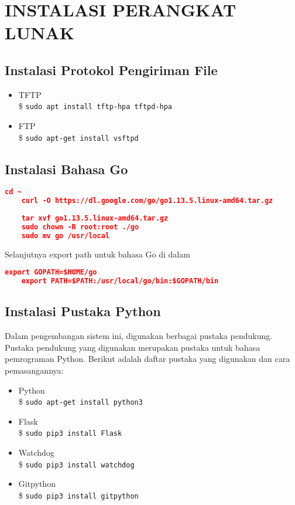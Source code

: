 \chapter{INSTALASI PERANGKAT LUNAK}

\section*{Instalasi Protokol Pengiriman File}
	
	\begin{itemize}
	\item TFTP \\
		\$ \texttt{sudo apt install tftp-hpa tftpd-hpa}
	\item FTP \\
		\$ \texttt{sudo apt-get install vsftpd}
	\end{itemize} 

\section*{Instalasi Bahasa Go}
	\begin{lstlisting}[frame=single,tabsize=2,breaklines,caption={Instalasi Bahasa Go},label=InstalasiGo, captionpos=b, language=json,numbers=none]
	cd ~
	curl -O https://dl.google.com/go/go1.13.5.linux-amd64.tar.gz
	
	tar xvf go1.13.5.linux-amd64.tar.gz
	sudo chown -R root:root ./go
	sudo mv go /usr/local
	\end{lstlisting}
	Selanjutnya export path untuk bahasa Go di dalam 
	\begin{lstlisting}[frame=single,tabsize=2,breaklines,caption={Pengaturan Path},label=nonrootuser, captionpos=b, language=json,numbers=none]
	export GOPATH=$HOME/go
	export PATH=$PATH:/usr/local/go/bin:$GOPATH/bin
	\end{lstlisting}
	
\section*{Instalasi Pustaka Python} \label{install:pythonlibrary}
	Dalam pengembangan sistem ini, digunakan berbagai pustaka pendukung. Pustaka pendukung yang digunakan merupakan pustaka untuk bahasa pemrograman Python. Berikut adalah daftar pustaka yang digunakan dan cara pemasangannya:
	
    \begin{itemize}
    \item Python \\
    	\$ \texttt{sudo apt-get install python3}
    \item Flask \\
    	\$ \texttt{sudo pip3 install Flask}
   	\item Watchdog \\
	   	\$ \texttt{sudo pip3 install watchdog}
   	\item Gitpython \\
    	\$ \texttt{sudo pip3 install gitpython}
    \end{itemize}



